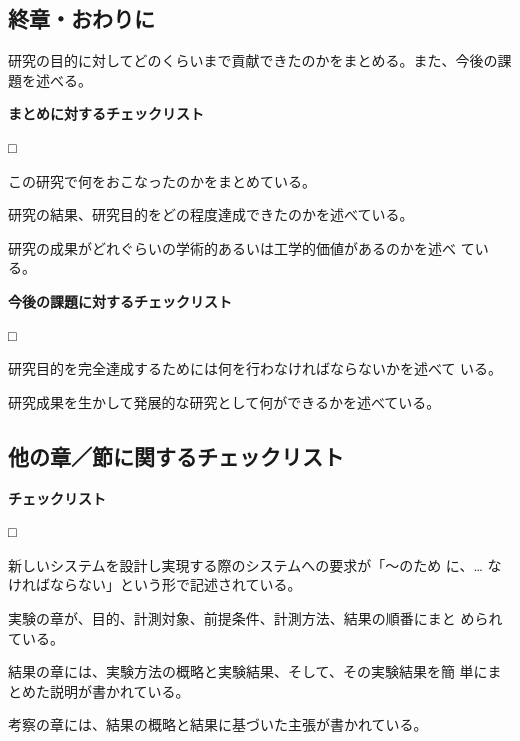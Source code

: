 \documentclass[11pt,a4j]{jsarticle}
\begin{document}
\subsection{終章・おわりに}

研究の目的に対してどのくらいまで貢献できたのかをまとめる。また、今後の課
題を述べる。

\begin{flushleft}
 {\bf まとめに対するチェックリスト}
\end{flushleft}
\begin{list}%
 {□} %
 {} %
 \item この研究で何をおこなったのかをまとめている。
 \item 研究の結果、研究目的をどの程度達成できたのかを述べている。
 \item 研究の成果がどれぐらいの学術的あるいは工学的価値があるのかを述べ
       ている。
\end{list}


\begin{flushleft}
 {\bf 今後の課題に対するチェックリスト}
\end{flushleft}
\begin{list}%
 {□} %
 {} %
 \item 研究目的を完全達成するためには何を行わなければならないかを述べて
       いる。
 \item 研究成果を生かして発展的な研究として何ができるかを述べている。
\end{list}


\subsection{他の章／節に関するチェックリスト}

\begin{flushleft}
 {\bf チェックリスト}
\end{flushleft}
\begin{list}%
 {□} %
 {} %
 \item 新しいシステムを設計し実現する際のシステムへの要求が「〜のため
       に、… なければならない」という形で記述されている。
 \item 実験の章が、目的、計測対象、前提条件、計測方法、結果の順番にまと
       められている。
 \item 結果の章には、実験方法の概略と実験結果、そして、その実験結果を簡
       単にまとめた説明が書かれている。
 \item 考察の章には、結果の概略と結果に基づいた主張が書かれている。
\end{list}
\end{document}
